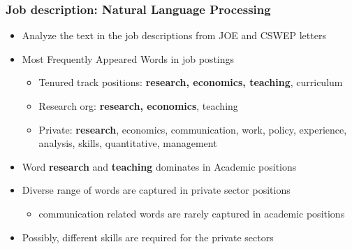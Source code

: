 \documentclass[10pt,svgnames,fragile]{beamer}
\begin{document}
\begin{frame}[label = NLP]
	\frametitle{Job description: Natural Language Processing}
	\begin{itemize}
		\item Analyze the text in the job descriptions from JOE and CSWEP letters
\vfill
		\item Most Frequently Appeared Words in job postings
		\begin{itemize}
			\vspace{1 mm}
			\item Tenured track positions: \textbf{research, economics, teaching}, curriculum
			\vspace{1 mm}
			\item Research org: \textbf{research, economics}, teaching
			\vspace{1 mm}
			\item Private: \textbf{research}, economics, communication, work, policy, experience, analysis, skills, quantitative, management
		\end{itemize}
\vfill		
		\item Word \textbf{research} and \textbf{teaching} dominates in Academic positions
\vfill
		\item Diverse range of words are captured in private sector positions
		\vspace{1 mm}
		\begin{itemize}
			\item communication related words are rarely captured in academic positions
		\end{itemize} 
\vfill
		\item Possibly, different skills are required for the private sectors \hyperlink{job_des}{}
\vfill
	\end{itemize}
\end{frame}


%
%
\end{document}
